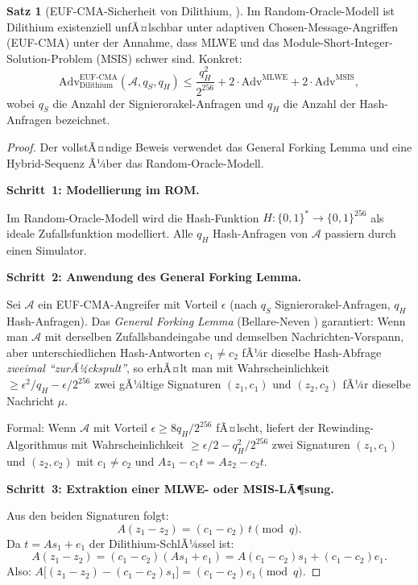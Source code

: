 ﻿\documentclass[a4paper,12pt]{article}
\theoremstyle{definition}
\newtheorem{satz}{Satz}[section]
\begin{document}
\begin{satz}[EUF-CMA-Sicherheit von Dilithium, \cite{DKL+22}]
Im Random-Oracle-Modell ist Dilithium existenziell unfÃ¤lschbar unter
adaptiven Chosen-Message-Angriffen (EUF-CMA) unter der Annahme,
dass MLWE und das Module-Short-Integer-Solution-Problem (MSIS) schwer sind.
Konkret:
\[
  \mathrm{Adv}^{\mathrm{EUF\text{-}CMA}}_{\mathrm{Dilithium}}(\mathcal{A}, q_S, q_H)
  \leq \frac{q_H^2}{2^{256}} + 2 \cdot \mathrm{Adv}^{\mathrm{MLWE}} + 2 \cdot \mathrm{Adv}^{\mathrm{MSIS}},
\]
wobei $q_S$ die Anzahl der Signierorakel-Anfragen und $q_H$ die
Anzahl der Hash-Anfragen bezeichnet.
\end{satz}

\begin{proof}
Der vollstÃ¤ndige Beweis verwendet das General Forking Lemma und eine
Hybrid-Sequenz Ã¼ber das Random-Oracle-Modell.

\textbf{Schritt~1: Modellierung im ROM.}

Im Random-Oracle-Modell wird die Hash-Funktion $H: \{0,1\}^* \to \{0,1\}^{256}$
als ideale Zufallsfunktion modelliert. Alle $q_H$ Hash-Anfragen von $\mathcal{A}$
passiern durch einen Simulator.

\textbf{Schritt~2: Anwendung des General Forking Lemma.}

Sei $\mathcal{A}$ ein EUF-CMA-Angreifer mit Vorteil $\epsilon$ (nach $q_S$
Signierorakel-Anfragen, $q_H$ Hash-Anfragen). Das \emph{General Forking Lemma}
(Bellare-Neven \cite{BN06}) garantiert: Wenn man $\mathcal{A}$ mit derselben
Zufallsbandeingabe und demselben Nachrichten-Vorspann, aber unterschiedlichen
Hash-Antworten $c_1 \neq c_2$ fÃ¼r dieselbe Hash-Abfrage
\emph{zweimal ``zurÃ¼ckspult''}, so erhÃ¤lt man mit Wahrscheinlichkeit
$\geq \epsilon^2 / q_H - \epsilon / 2^{256}$
zwei gÃ¼ltige Signaturen $(z_1, c_1)$ und $(z_2, c_2)$ fÃ¼r dieselbe Nachricht $\mu$.

Formal: Wenn $\mathcal{A}$ mit Vorteil $\epsilon \geq 8 q_H / 2^{256}$ fÃ¤lscht,
liefert der Rewinding-Algorithmus mit Wahrscheinlichkeit
$\geq \epsilon/2 - q_H^2/2^{256}$
zwei Signaturen $(z_1, c_1)$ und $(z_2, c_2)$ mit
$c_1 \neq c_2$ und $Az_1 - c_1 t = Az_2 - c_2 t$.

\textbf{Schritt~3: Extraktion einer MLWE- oder MSIS-LÃ¶sung.}

Aus den beiden Signaturen folgt:
\[
  A(z_1 - z_2) = (c_1 - c_2)\,t \pmod{q}.
\]
Da $t = As_1 + e_1$ der Dilithium-SchlÃ¼ssel ist:
\[
  A(z_1 - z_2) = (c_1 - c_2)(As_1 + e_1) = A(c_1-c_2)s_1 + (c_1-c_2)e_1.
\]
Also: $A\bigl[(z_1 - z_2) - (c_1-c_2)s_1\bigr] = (c_1-c_2)e_1 \pmod{q}$.


\end{proof}
\end{document}
